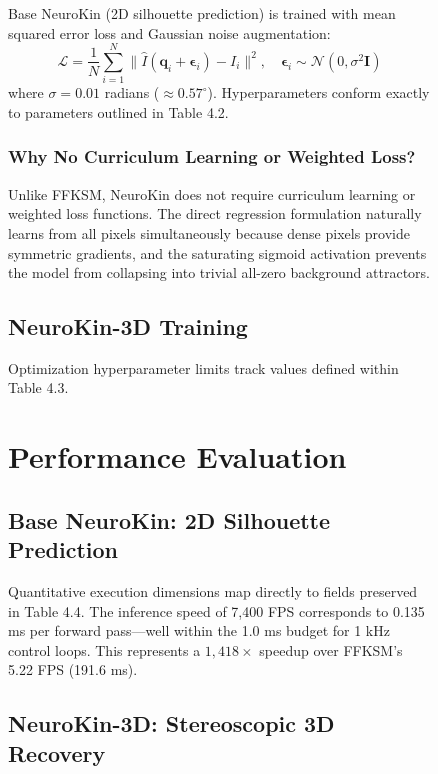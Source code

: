\documentclass[12pt,a4paper,oneside]{report}
\begin{document}
\begin{figure}[H]
Base NeuroKin (2D silhouette prediction) is trained with mean squared error loss and Gaussian noise augmentation:
\begin{equation}
\mathcal{L} = \frac{1}{N} \sum_{i=1}^{N} \|\hat{I}(\mathbf{q}_i + \boldsymbol{\epsilon}_i) - I_i\|^2, \quad \boldsymbol{\epsilon}_i \sim \mathcal{N}(0, \sigma^2 \mathbf{I})
\end{equation}
where $\sigma = 0.01$ radians ($\approx 0.57^\circ$). Hyperparameters conform exactly to parameters outlined in Table 4.2.

\subsubsection{Why No Curriculum Learning or Weighted Loss?}

Unlike FFKSM, NeuroKin does not require curriculum learning or weighted loss functions. The direct regression formulation naturally learns from all pixels simultaneously because dense pixels provide symmetric gradients, and the saturating sigmoid activation prevents the model from collapsing into trivial all-zero background attractors.

\subsection{NeuroKin-3D Training}

Optimization hyperparameter limits track values defined within Table 4.3.

\section{Performance Evaluation}

\subsection{Base NeuroKin: 2D Silhouette Prediction}

Quantitative execution dimensions map directly to fields preserved in Table 4.4. The inference speed of 7,400 FPS corresponds to 0.135 ms per forward pass---well within the 1.0 ms budget for 1 kHz control loops. This represents a $1,418\times$ speedup over FFKSM's 5.22 FPS (191.6 ms).

\subsection{NeuroKin-3D: Stereoscopic 3D Recovery}


\end{figure}
\end{document}
